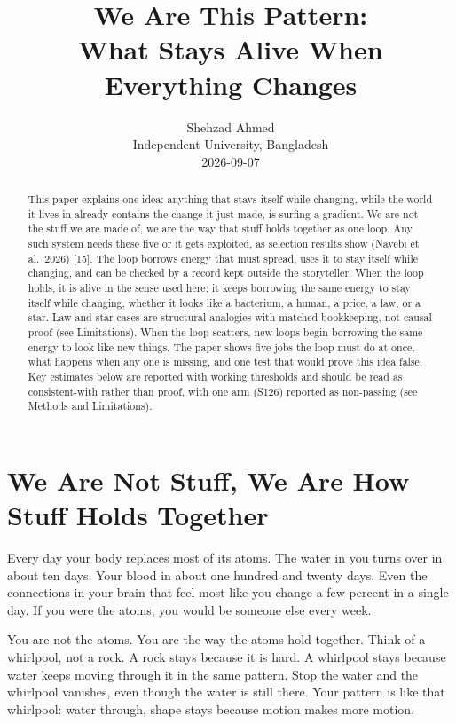 \documentclass[11pt,a4paper]{article}
\title{We Are This Pattern:\\
What Stays Alive When Everything Changes}
\author{Shehzad Ahmed\\Independent University, Bangladesh\\2026-09-07}
\date{}
\begin{document}
\maketitle

\begin{abstract}
This paper explains one idea: anything that stays itself while changing, while the world it lives in already contains the change it just made, is surfing a gradient. We are not the stuff we are made of, we are the way that stuff holds together as one loop. Any such system needs these five or it gets exploited, as selection results show (Nayebi et al.\ 2026) [15]. The loop borrows energy that must spread, uses it to stay itself while changing, and can be checked by a record kept outside the storyteller. When the loop holds, it is alive in the sense used here: it keeps borrowing the same energy to stay itself while changing, whether it looks like a bacterium, a human, a price, a law, or a star. Law and star cases are structural analogies with matched bookkeeping, not causal proof (see Limitations). When the loop scatters, new loops begin borrowing the same energy to look like new things. The paper shows five jobs the loop must do at once, what happens when any one is missing, and one test that would prove this idea false. Key estimates below are reported with working thresholds and should be read as consistent-with rather than proof, with one arm (S126) reported as non-passing (see Methods and Limitations).
\end{abstract}

\section{We Are Not Stuff, We Are How Stuff Holds Together}

Every day your body replaces most of its atoms. The water in you turns over in about ten days. Your blood in about one hundred and twenty days. Even the connections in your brain that feel most like you change a few percent in a single day. If you were the atoms, you would be someone else every week.

You are not the atoms. You are the way the atoms hold together. Think of a whirlpool, not a rock. A rock stays because it is hard. A whirlpool stays because water keeps moving through it in the same pattern. Stop the water and the whirlpool vanishes, even though the water is still there. Your pattern is like that whirlpool: water through, shape stays because motion makes more motion.
\end{document}
